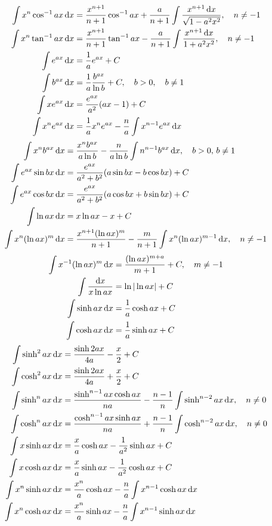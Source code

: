 \begin{align} 
 \int x^n \cos^{-1} ax \dif x &= \frac{x^{n+1}}{n+1} \cos^{-1} ax + \frac{a}{n+1} \int \frac{x^{n+1} \dif x}{\sqrt{1-a^2x^2}}, \quad n \neq -1 \\
 \int x^n \tan^{-1} ax \dif x &= \frac{x^{n+1}}{n+1} \tan^{-1} ax - \frac{a}{n+1} \int \frac{x^{n+1} \dif x}{1+ a^2 x^2}, \quad n \neq -1 \\
 \int e^{ax} \dif x&=\frac{1}{a} e^{ax} + C \\
 \int b^{ax} \dif x &= \frac{1}{a} \frac{b^{ax}}{\ln b} + C, \quad b>0, \quad b \neq 1 \\
 \int x e^{ax} \dif x &= \frac{e^{ax}}{a^2} (ax-1) + C \\
 \int x^n e^{ax} \dif x &= \frac{1}{a} x^n e^{ax} - \frac{n}{a} \int x^{n-1} e^{ax} \dif x  
\end{align}
\begin{align} 
 \int x^n b^{ax} \dif x &= \frac{x^n b^{ax}}{a \ln b}-\frac{n}{a\ln b} \int n^{n-1} b^{ax} \dif x, \quad b> 0, \, b \neq 1 \\
 \int e^{ax} \sin bx \dif x &= \frac{e^{ax}}{a^2 + b^2} (a \sin bx - b \cos bx ) + C \\
 \int e^{ax} \cos bx \dif x &= \frac{e^{ax}}{a^2 + b^2} (a \cos bx + b \sin bx ) + C \\
 \int \ln ax \dif x &= x \ln ax - x + C \\
 \int x^n (\ln ax)^m \dif x &= \frac{x^{n+1} ( \ln ax )^m}{n+1} - \frac{m}{n+1} \int x^n (\ln ax)^{m-1} \dif x, \quad n \neq -1 
\end{align}
\begin{align} 
 \int x^{-1} (\ln ax)^{m} \dif x &= \frac{(\ln ax)^{m+a}}{m+1} + C, \quad m \neq -1 \\
 \int \frac{\dif x}{x \ln ax} &= \ln | \ln ax | + C \\
 \int \sinh ax \dif x &= \frac{1}{a} \cosh ax + C \\
 \int \cosh ax \dif x &= \frac{1}{a} \sinh ax + C
 \end{align}
\begin{align} 
 \int \sinh^2 ax \dif x &= \frac{\sinh 2ax}{4a} - \frac{x}{2} + C \\
 \int \cosh^2 ax \dif x&= \frac{\sinh 2ax }{4a} + \frac{x}{2} + C \\
 \int \sinh^{n} ax \dif x &= \frac{\sinh^{n-1} ax \cosh ax}{na} - \frac{n-1}{n} \int \sinh^{n-2} ax \dif x, \quad n \neq 0 \\
 \int \cosh^{n} ax \dif x &= \frac{\cosh^{n-1} ax \sinh ax}{na} + \frac{n-1}{n} \int \cosh^{n-2} ax \dif x, \quad n \neq 0 \\
 \int x \sinh ax \dif x&= \frac{x}{a} \cosh ax - \frac{1}{a^2} \sinh ax + C \\
 \int x \cosh ax \dif x&= \frac{x}{a} \sinh ax - \frac{1}{a^2} \cosh ax + C \\
 \int x^n \sinh ax \dif x &= \frac{x^n}{a} \cosh ax - \frac{n}{a} \int x^{n-1} \cosh ax \dif x  \\
 \int x^n \cosh ax \dif x &= \frac{x^n}{a} \sinh ax - \frac{n}{a} \int x^{n-1} \sinh ax \dif x  
\end{align}
